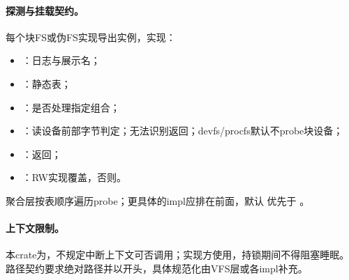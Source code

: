 \paragraph{探测与挂载契约。}
每个块FS或伪FS实现导出实例，实现：
\begin{itemize}
 \item {}：日志与展示名；
 \item {}：静态表；
 \item {}：是否处理指定组合；
 \item {}：读设备前部字节判定；无法识别返回；devfs/procfs默认不probe块设备；
 \item {}：返回；
 \item {}：RW实现覆盖，否则。
\end{itemize}
聚合层按表顺序遍历probe；更具体的impl应排在前面，默认  优先于 。

\paragraph{上下文限制。}
本crate为，不规定中断上下文可否调用；实现方使用，持锁期间不得阻塞睡眠。路径契约要求绝对路径并以\code{/}开头，具体规范化由VFS层或各impl补充。
